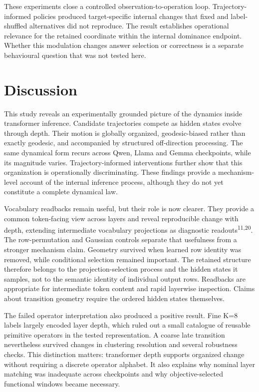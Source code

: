 \documentclass[11pt]{article}
\begin{document}
These experiments close a controlled observation-to-operation loop. Trajectory-informed policies produced target-specific internal changes that fixed and label-shuffled alternatives did not reproduce. The result establishes operational relevance for the retained coordinate within the internal dominance endpoint. Whether this modulation changes answer selection or correctness is a separate behavioural question that was not tested here.

\section{Discussion}
This study reveals an experimentally grounded picture of the dynamics inside transformer inference. Candidate trajectories compete as hidden states evolve through depth. Their motion is globally organized, geodesic-biased rather than exactly geodesic, and accompanied by structured off-direction processing. The same dynamical form recurs across Qwen, Llama and Gemma checkpoints, while its magnitude varies. Trajectory-informed interventions further show that this organization is operationally discriminating. These findings provide a mechanism-level account of the internal inference process, although they do not yet constitute a complete dynamical law.

Vocabulary readbacks remain useful, but their role is now clearer. They provide a common token-facing view across layers and reveal reproducible change with depth, extending intermediate vocabulary projections as diagnostic readouts\textsuperscript{11,20}. The row-permutation and Gaussian controls separate that usefulness from a stronger mechanism claim. Geometry survived when learned row identity was removed, while conditional selection remained important. The retained structure therefore belongs to the projection-selection process and the hidden states it samples, not to the semantic identity of individual output rows. Readbacks are appropriate for intermediate token content and rapid layerwise inspection. Claims about transition geometry require the ordered hidden states themselves.

The failed operator interpretation also produced a positive result. Fine K=8 labels largely encoded layer depth, which ruled out a small catalogue of reusable primitive operators in the tested representation. A coarse late transition nevertheless survived changes in clustering resolution and several robustness checks. This distinction matters: transformer depth supports organized change without requiring a discrete operator alphabet. It also explains why nominal layer matching was inadequate across checkpoints and why objective-selected functional windows became necessary.
\end{document}
